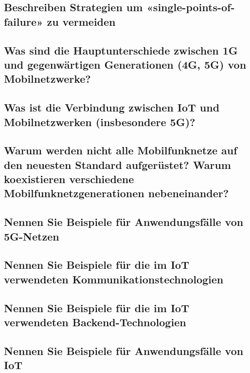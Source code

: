 \subsection*{Beschreiben Strategien um «single-points-of-failure» zu vermeiden}

\subsection*{Was sind die Hauptunterschiede zwischen 1G und gegenwärtigen Generationen (4G, 5G) von Mobilnetzwerke?}
\subsection*{Was ist die Verbindung zwischen IoT und Mobilnetzwerken (insbesondere 5G)?}
\subsection*{Warum werden nicht alle Mobilfunknetze auf den neuesten Standard aufgerüstet? Warum koexistieren verschiedene Mobilfunknetzgenerationen nebeneinander?}
\subsection*{Nennen Sie Beispiele für Anwendungsfälle von 5G-Netzen}
\subsection*{Nennen Sie Beispiele für die im IoT verwendeten Kommunikationstechnologien}
\subsection*{Nennen Sie Beispiele für die im IoT verwendeten Backend-Technologien}
\subsection*{Nennen Sie Beispiele für Anwendungsfälle von IoT}